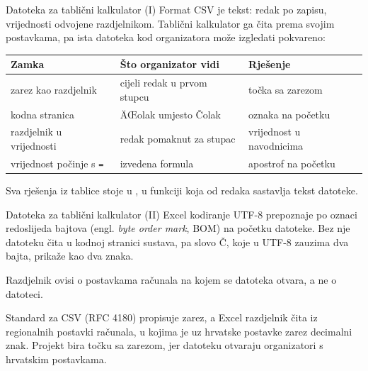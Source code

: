\begin{frame}{Datoteka za tablični kalkulator (I)}
Format CSV je tekst: redak po zapisu, vrijednosti odvojene razdjelnikom. Tablični kalkulator ga čita prema svojim postavkama, pa ista datoteka kod organizatora može izgledati pokvareno:

\vspace{0.5em}
\begin{center}
{\small
\setlength{\tabcolsep}{6pt}
\renewcommand{\arraystretch}{1.3}
\begin{tabular}{@{}L{3.6cm}L{4.4cm}L{4.0cm}@{}}
  \toprule
  \textbf{Zamka} & \textbf{Što organizator vidi} & \textbf{Rješenje} \\
  \midrule
  zarez kao razdjelnik & cijeli redak u prvom stupcu & točka sa zarezom \\
  kodna stranica & ÄŒolak umjesto Čolak & oznaka na početku \\
  razdjelnik u vrijednosti & redak pomaknut za stupac & vrijednost u navodnicima \\
  vrijednost počinje s \texttt{=} & izvedena formula & apostrof na početku \\
  \bottomrule
\end{tabular}
}
\end{center}

\vspace{0.6em}
Sva rješenja iz tablice stoje u , u funkciji koja od redaka sastavlja tekst datoteke.
\end{frame}

\begin{frame}{Datoteka za tablični kalkulator (II)}
Excel kodiranje UTF-8 prepoznaje po oznaci redoslijeda bajtova (engl. \emph{byte order mark}, BOM) na početku datoteke. Bez nje datoteku čita u kodnoj stranici sustava, pa slovo Č, koje u UTF-8 zauzima dva bajta, prikaže kao dva znaka.

\vspace{0.6em}
Razdjelnik ovisi o postavkama računala na kojem se datoteka otvara, a ne o datoteci.

\vspace{0.6em}
\begin{konvencija}
Standard za CSV (RFC 4180) propisuje zarez, a Excel razdjelnik čita iz regionalnih postavki računala, u kojima je uz hrvatske postavke zarez decimalni znak. Projekt bira točku sa zarezom, jer datoteku otvaraju organizatori s hrvatskim postavkama.
\end{konvencija}
\end{frame}

